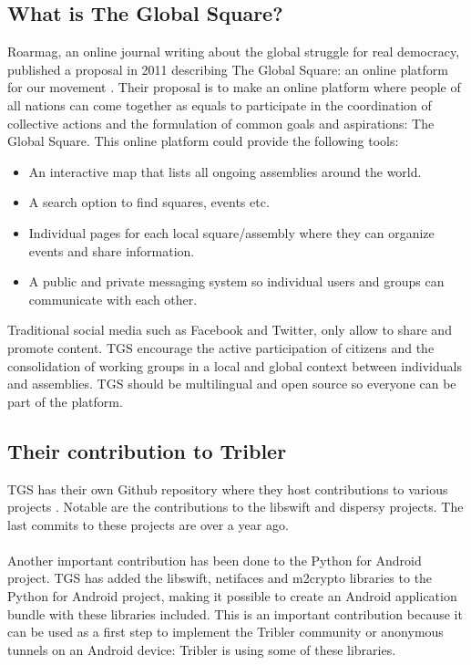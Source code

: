 \documentclass[11pt]{article}
\begin{document}
\subsection{What is The Global Square?}
Roarmag, an online journal writing about the global struggle for real democracy, published a proposal in 2011 describing The Global Square: an online platform for our movement \cite{theglobalsquare}. Their proposal is to make an online platform where people of all nations can come together as equals to participate in the coordination of collective actions and the formulation of common goals and aspirations: The Global Square. This online platform could provide the following tools:
\begin{itemize}
\item An interactive map that lists all ongoing assemblies around the world.
\item A search option to find squares, events etc.
\item Individual pages for each local square/assembly where they can organize events and share information.
\item A public and private messaging system so individual users and groups can communicate with each other.
\end{itemize}
Traditional social media such as Facebook and Twitter, only allow to share and promote content. TGS encourage the active participation of citizens and the consolidation of working groups in a local and global context between individuals and assemblies. TGS should be multilingual and open source so everyone can be part of the platform.

\subsection{Their contribution to Tribler}
TGS has their own Github repository where they host contributions to various projects \cite{theglobalsquaregithub}. Notable are the contributions to the libswift and dispersy projects. The last commits to these projects are over a year ago.\\\\
Another important contribution has been done to the Python for Android project. TGS has added the libswift, netifaces and m2crypto libraries to the Python for Android project, making it possible to create an Android application bundle with these libraries included. This is an important contribution because it can be used as a first step to implement the Tribler community or anonymous tunnels on an Android device: Tribler is using some of these libraries.
\end{document}
